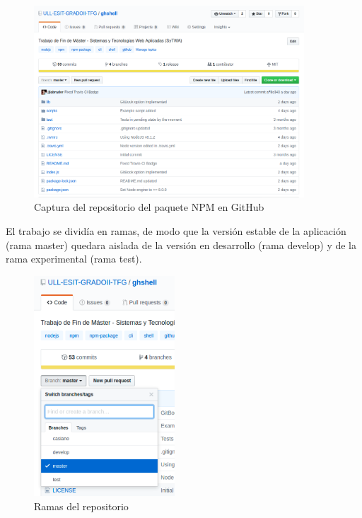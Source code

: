\begin{figure}[H]
\begin{center}
\includegraphics[width=0.9\textwidth]{images/github1}
\caption{Captura del repositorio del paquete NPM en GitHub}
\label{fig:github1}
\end{center}
\end{figure}

El trabajo se dividía en ramas, de modo que la versión estable de la aplicación (rama master) quedara aislada de la 
versión en desarrollo (rama develop) y de la rama experimental (rama test).


\begin{figure}[H]
\begin{center}
\includegraphics[width=0.47\textwidth]{images/github2}
\caption{Ramas del repositorio}
\label{fig:github2}
\end{center}
\end{figure}


